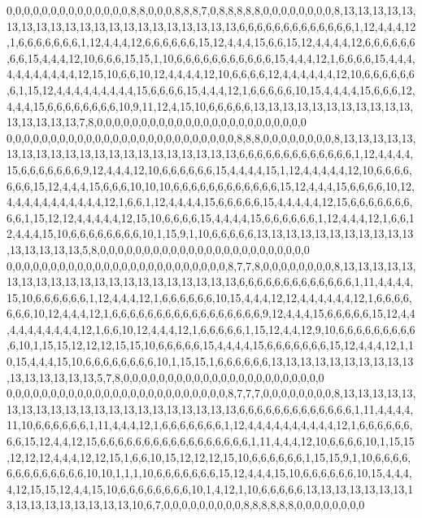 0,0,0,0,0,0,0,0,0,0,0,0,0,0,8,8,0,0,0,8,8,8,7,0,8,8,8,8,8,0,0,0,0,0,0,0,0,8,13,13,13,13,13,13,13,13,13,13,13,13,13,13,13,13,13,13,13,13,13,6,6,6,6,6,6,6,6,6,6,6,6,6,1,12,4,4,4,12,1,6,6,6,6,6,6,6,1,12,4,4,4,12,6,6,6,6,6,6,15,12,4,4,4,15,6,6,15,12,4,4,4,4,12,6,6,6,6,6,6,6,6,15,4,4,4,12,10,6,6,6,15,15,1,10,6,6,6,6,6,6,6,6,6,6,6,15,4,4,4,12,1,6,6,6,6,15,4,4,4,4,4,4,4,4,4,4,4,12,15,10,6,6,10,12,4,4,4,4,12,10,6,6,6,6,12,4,4,4,4,4,4,12,10,6,6,6,6,6,6,6,1,15,12,4,4,4,4,4,4,4,4,4,15,6,6,6,6,15,4,4,4,12,1,6,6,6,6,6,10,15,4,4,4,4,15,6,6,6,12,4,4,4,15,6,6,6,6,6,6,6,6,10,9,11,12,4,15,10,6,6,6,6,6,13,13,13,13,13,13,13,13,13,13,13,13,13,13,13,13,7,8,0,0,0,0,0,0,0,0,0,0,0,0,0,0,0,0,0,0,0,0,0,0,0,0
0,0,0,0,0,0,0,0,0,0,0,0,0,0,0,0,0,0,0,0,0,0,0,0,0,0,8,8,8,0,0,0,0,0,0,0,0,8,13,13,13,13,13,13,13,13,13,13,13,13,13,13,13,13,13,13,13,13,13,6,6,6,6,6,6,6,6,6,6,6,6,6,1,12,4,4,4,4,15,6,6,6,6,6,6,6,9,12,4,4,4,12,10,6,6,6,6,6,6,15,4,4,4,4,15,1,12,4,4,4,4,4,12,10,6,6,6,6,6,6,6,15,12,4,4,4,15,6,6,6,10,10,10,6,6,6,6,6,6,6,6,6,6,6,6,15,12,4,4,4,15,6,6,6,6,10,12,4,4,4,4,4,4,4,4,4,4,4,12,1,6,6,1,12,4,4,4,4,15,6,6,6,6,6,15,4,4,4,4,4,12,15,6,6,6,6,6,6,6,6,6,1,15,12,12,4,4,4,4,4,12,15,10,6,6,6,6,15,4,4,4,4,15,6,6,6,6,6,6,1,12,4,4,4,12,1,6,6,12,4,4,4,15,10,6,6,6,6,6,6,6,6,10,1,15,9,1,10,6,6,6,6,6,13,13,13,13,13,13,13,13,13,13,13,13,13,13,13,13,5,8,0,0,0,0,0,0,0,0,0,0,0,0,0,0,0,0,0,0,0,0,0,0,0,0
0,0,0,0,0,0,0,0,0,0,0,0,0,0,0,0,0,0,0,0,0,0,0,0,0,8,7,7,8,0,0,0,0,0,0,0,0,8,13,13,13,13,13,13,13,13,13,13,13,13,13,13,13,13,13,13,13,13,13,6,6,6,6,6,6,6,6,6,6,6,6,6,1,11,4,4,4,4,15,10,6,6,6,6,6,6,1,12,4,4,4,12,1,6,6,6,6,6,6,10,15,4,4,4,12,12,4,4,4,4,4,4,12,1,6,6,6,6,6,6,6,10,12,4,4,4,12,1,6,6,6,6,6,6,6,6,6,6,6,6,6,6,6,6,6,9,12,4,4,4,15,6,6,6,6,6,15,12,4,4,4,4,4,4,4,4,4,4,12,1,6,6,10,12,4,4,4,12,1,6,6,6,6,6,1,15,12,4,4,12,9,10,6,6,6,6,6,6,6,6,6,6,10,1,15,15,12,12,12,15,15,10,6,6,6,6,6,15,4,4,4,4,15,6,6,6,6,6,6,6,15,12,4,4,4,12,1,10,15,4,4,4,15,10,6,6,6,6,6,6,6,6,10,1,15,15,1,6,6,6,6,6,6,13,13,13,13,13,13,13,13,13,13,13,13,13,13,13,13,5,7,8,0,0,0,0,0,0,0,0,0,0,0,0,0,0,0,0,0,0,0,0,0,0,0
0,0,0,0,0,0,0,0,0,0,0,0,0,0,0,0,0,0,0,0,0,0,0,0,0,8,7,7,7,0,0,0,0,0,0,0,0,8,13,13,13,13,13,13,13,13,13,13,13,13,13,13,13,13,13,13,13,13,13,6,6,6,6,6,6,6,6,6,6,6,6,6,1,11,4,4,4,4,11,10,6,6,6,6,6,6,1,11,4,4,4,12,1,6,6,6,6,6,6,6,1,12,4,4,4,4,4,4,4,4,4,4,12,1,6,6,6,6,6,6,6,6,15,12,4,4,12,15,6,6,6,6,6,6,6,6,6,6,6,6,6,6,6,6,6,1,11,4,4,4,12,10,6,6,6,6,10,1,15,15,12,12,12,4,4,4,12,12,15,1,6,6,10,15,12,12,12,15,10,6,6,6,6,6,6,1,15,15,9,1,10,6,6,6,6,6,6,6,6,6,6,6,6,6,10,10,1,1,1,10,6,6,6,6,6,6,6,15,12,4,4,4,15,10,6,6,6,6,6,6,10,15,4,4,4,4,12,15,15,12,4,4,15,10,6,6,6,6,6,6,6,6,10,1,4,12,1,10,6,6,6,6,6,13,13,13,13,13,13,13,13,13,13,13,13,13,13,13,13,10,6,7,0,0,0,0,0,0,0,0,0,8,8,8,8,8,8,0,0,0,0,0,0,0,0
